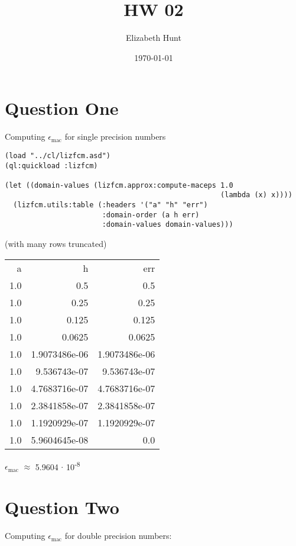 \documentclass[11pt]{article}
\author{Elizabeth Hunt}
\date{\today}
\title{HW 02}
\begin{document}
\maketitle
\setlength\parindent{0pt}

\section{Question One}
\label{sec:orga203815}
Computing \(\epsilon_{\text{mac}}\) for single precision numbers

\begin{verbatim}
(load "../cl/lizfcm.asd")
(ql:quickload :lizfcm)

(let ((domain-values (lizfcm.approx:compute-maceps 1.0
                                                   (lambda (x) x))))
  (lizfcm.utils:table (:headers '("a" "h" "err")
                       :domain-order (a h err)
                       :domain-values domain-values)))
\end{verbatim}

(with many rows truncated)

\begin{center}
\begin{tabular}{rrr}
a & h & err\\[0pt]
1.0 & 0.5 & 0.5\\[0pt]
1.0 & 0.25 & 0.25\\[0pt]
1.0 & 0.125 & 0.125\\[0pt]
1.0 & 0.0625 & 0.0625\\[0pt]
1.0 & 1.9073486e-06 & 1.9073486e-06\\[0pt]
1.0 & 9.536743e-07 & 9.536743e-07\\[0pt]
1.0 & 4.7683716e-07 & 4.7683716e-07\\[0pt]
1.0 & 2.3841858e-07 & 2.3841858e-07\\[0pt]
1.0 & 1.1920929e-07 & 1.1920929e-07\\[0pt]
1.0 & 5.9604645e-08 & 0.0\\[0pt]
\end{tabular}
\end{center}

\(\epsilon_{\text{mac}}\) \(\approx\) 5.9604 \(\cdot\) 10\textsuperscript{-8}

\section{Question Two}
\label{sec:orgdd79be1}
Computing \(\epsilon_{\text{mac}}\) for double precision numbers:
\end{document}
